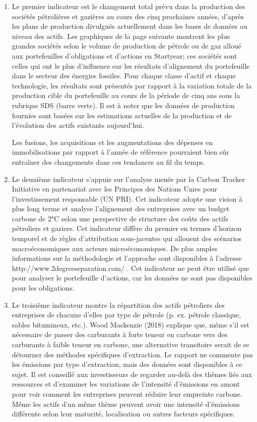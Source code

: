 \documentclass[10pt,table,a4]{article}\usepackage[]{graphicx}\usepackage[]{color}
\begin{document}
\begin{multicols}{2}
{		
		\begin{enumerate}
			\item Le premier indicateur est le changement total prévu dans la production des sociétés pétrolières et gazières au cours des cinq prochaines années, d'après les plans de production divulgués actuellement dans les bases de données au niveau des actifs. Les graphiques de la page suivante montrent les plus grandes sociétés selon le volume de production de pétrole ou de gaz alloué aux portefeuilles d'obligations et d'actions en Startyear; ces sociétés sont celles qui ont le plus d'influence sur les résultats d'alignement du portefeuille dans le secteur des énergies fossiles. Pour chaque classe d'actif et chaque technologie, les résultats sont présentés par rapport à la variation totale de la production cible du portefeuille au cours de la période de cinq ans sous la rubrique SDS (barre verte). Il est à noter que les données de production fournies sont basées sur les estimations actuelles de la production et de l’évolution des actifs existants aujourd’hui.
			
			Les fusions, les acquisitions et les augmentations des dépenses en immobilisations par rapport à l'année de référence pourraient bien sûr entraîner des changements dans ces tendances au fil du temps. 
			
			\item Le deuxième indicateur s'appuie sur l'analyse menée par la Carbon Tracker Initiative en partenariat avec les Principes des Nations Unies pour l'investissement responsable (UN PRI). Cet indicateur adopte une vision à plus long terme et analyse l'alignement des entreprises avec un budget carbone de 2°C selon une perspective de structure des coûts des actifs pétroliers et gaziers. Cet indicateur diffère du premier en termes d'horizon temporel et de règles d’attribution sous-jacentes qui allouent des scénarios macroéconomiques aux acteurs microéconomiques. De plus amples informations sur la méthodologie et l'approche sont disponibles à l'adresse http://www.2degreeseparation.com/ . Cet indicateur ne peut être utilisé que pour analyser le portefeuille d'actions, car les données ne sont pas disponibles pour les obligations.
			
			\item Le troisième indicateur montre la répartition des actifs pétroliers des entreprises de chacune d'elles par type de pétrole (p. ex. pétrole classique, sables bitumineux, etc.). Wood Mackenzie (2018) explique que, même s'il est nécessaire de passer des carburants à forte teneur en carbone vers des carburants à faible teneur en carbone, une alternative transitoire serait de se détourner des méthodes spécifiques d'extraction. Le rapport ne commente pas les émissions par type d'extraction, mais des données sont disponibles à ce sujet. Il est conseillé aux investisseurs de regarder au-delà des thèmes liés aux ressources et d'examiner les variations de l'intensité d'émissions en amont pour voir comment les entreprises peuvent réduire leur empreinte carbone. Même les actifs d'un même thème peuvent avoir une intensité d'émissions différente selon leur maturité, localisation ou autres facteurs spécifiques.
			

\end{enumerate}}
\end{multicols}
\end{document}
